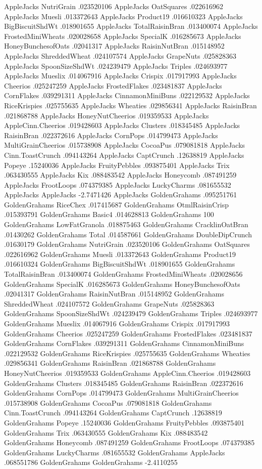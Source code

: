 AppleJacks	NutriGrain	.023520106
AppleJacks	OatSquares	.022616962
AppleJacks	Muesli	.013372643
AppleJacks	Product19	.016610323
AppleJacks	BigBiscuitShdWt	.018901655
AppleJacks	TotalRaisinBran	.013400074
AppleJacks	FrostedMiniWheats	.020028658
AppleJacks	SpecialK	.016285673
AppleJacks	HoneyBunchesofOats	.02041317
AppleJacks	RaisinNutBran	.015148952
AppleJacks	ShreddedWheat	.024107574
AppleJacks	GrapeNuts	.025828363
AppleJacks	SpoonSizeShdWt	.024239479
AppleJacks	Triples	.024693977
AppleJacks	Mueslix	.014067916
AppleJacks	Crispix	.017917993
AppleJacks	Cheerios	.025247259
AppleJacks	FrostedFlakes	.023481837
AppleJacks	CornFlakes	.039291311
AppleJacks	CinnamonMiniBuns	.022129532
AppleJacks	RiceKrispies	.025755635
AppleJacks	Wheaties	.029856341
AppleJacks	RaisinBran	.021868788
AppleJacks	HoneyNutCheerios	.019359533
AppleJacks	AppleCinn.Cheerios	.019428603
AppleJacks	Clusters	.018345485
AppleJacks	RaisinBran	.022372616
AppleJacks	CornPops	.014799473
AppleJacks	MultiGrainCheerios	.015738908
AppleJacks	CocoaPus	.079081818
AppleJacks	Cinn.ToastCrunch	.094143264
AppleJacks	CaptCrunch	.12638819
AppleJacks	Popeye	.15240036
AppleJacks	FruityPebbles	.093875401
AppleJacks	Trix	.063430555
AppleJacks	Kix	.088483542
AppleJacks	Honeycomb	.087491259
AppleJacks	FrootLoops	.074379385
AppleJacks	LuckyCharms	.081655532
AppleJacks	AppleJacks	-2.7471426
AppleJacks	GoldenGrahams	.095251761
GoldenGrahams	RiceChex	.017415687
GoldenGrahams	OtmlRaisinCrisp	.015393791
GoldenGrahams	Basic4	.014628813
GoldenGrahams	100%
GoldenGrahams	LowFatGranola	.018875463
GoldenGrahams	CracklinOatBran	.01430262
GoldenGrahams	Total	.014587661
GoldenGrahams	DoubleDipCrunch	.01630179
GoldenGrahams	NutriGrain	.023520106
GoldenGrahams	OatSquares	.022616962
GoldenGrahams	Muesli	.013372643
GoldenGrahams	Product19	.016610324
GoldenGrahams	BigBiscuitShdWt	.018901655
GoldenGrahams	TotalRaisinBran	.013400074
GoldenGrahams	FrostedMiniWheats	.020028656
GoldenGrahams	SpecialK	.016285673
GoldenGrahams	HoneyBunchesofOats	.02041317
GoldenGrahams	RaisinNutBran	.015148952
GoldenGrahams	ShreddedWheat	.024107572
GoldenGrahams	GrapeNuts	.025828363
GoldenGrahams	SpoonSizeShdWt	.024239479
GoldenGrahams	Triples	.024693977
GoldenGrahams	Mueslix	.014067916
GoldenGrahams	Crispix	.017917993
GoldenGrahams	Cheerios	.025247259
GoldenGrahams	FrostedFlakes	.023481837
GoldenGrahams	CornFlakes	.039291311
GoldenGrahams	CinnamonMiniBuns	.022129532
GoldenGrahams	RiceKrispies	.025755635
GoldenGrahams	Wheaties	.029856341
GoldenGrahams	RaisinBran	.021868788
GoldenGrahams	HoneyNutCheerios	.019359533
GoldenGrahams	AppleCinn.Cheerios	.019428603
GoldenGrahams	Clusters	.018345485
GoldenGrahams	RaisinBran	.022372616
GoldenGrahams	CornPops	.014799473
GoldenGrahams	MultiGrainCheerios	.015738908
GoldenGrahams	CocoaPus	.079081818
GoldenGrahams	Cinn.ToastCrunch	.094143264
GoldenGrahams	CaptCrunch	.12638819
GoldenGrahams	Popeye	.15240036
GoldenGrahams	FruityPebbles	.093875401
GoldenGrahams	Trix	.063430555
GoldenGrahams	Kix	.088483542
GoldenGrahams	Honeycomb	.087491259
GoldenGrahams	FrootLoops	.074379385
GoldenGrahams	LuckyCharms	.081655532
GoldenGrahams	AppleJacks	.068551786
GoldenGrahams	GoldenGrahams	-2.4110255
